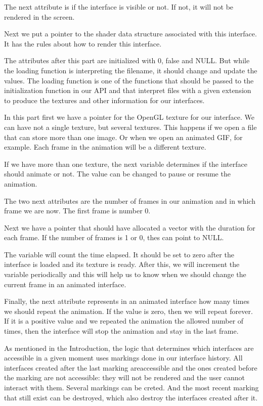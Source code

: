 The next attribute is if the interface is visible or not. If not, it
will not be rendered in the screen.

Next we put a pointer to the shader data structure associated with
this interface. It has the rules about how to render this interface.

The attributes after this part are initialized with 0, false and
NULL. But while the loading function is interpreting the filename, it
should change and update the values. The loading function is one of
the functions that should be passed to the initialization function in
our API and that interpret files with a given extension to produce the
textures and other information for our interfaces.

In this part first we have a pointer for the OpenGL texture for our
interface. We can have not a single texture, but several
textures. This happens if we open a file that can store more than one
image. Or when we open an animated GIF, for example. Each frame in the
animation will be a different texture.

If we have more than one texture, the next variable determines if the
interface should animate or not. The value can be changed to pause or
resume the animation.

The two next attributes are the number of frames in our animation and
in which frame we are now. The first frame is number 0.

Next we have a pointer that should have allocated a vector with the
duration for each frame. If the number of frames is 1 or 0, thes can
point to NULL.

The variable  will count the time elapsed. It should be
set to zero after the interface is loaded and its texture is
ready. After this, we will increment the variable periodically and
this will help us to know when we should change the current frame in
an animated interface.

Finally, the next attribute represents in an animated interface how
many times we should repeat the animation. If the value is zero, then
we will repeat forever. If it is a positive value and we repeated the
animation the allowed number of times, then the interface will stop
the animation and stay in the last frame.


As mentioned in the Introduction, the logic that determines which
interfaces are accessible in a given moment uses markings done in our
interface history. All interfaces created after the last marking
areaccessible and the ones created before the marking are not
accessible: they will not be rendered and the user cannot interact
with them. Several markings can be creted. And the most recent marking
that still exist can be destroyed, which also destroy the interfaces
created after it.

